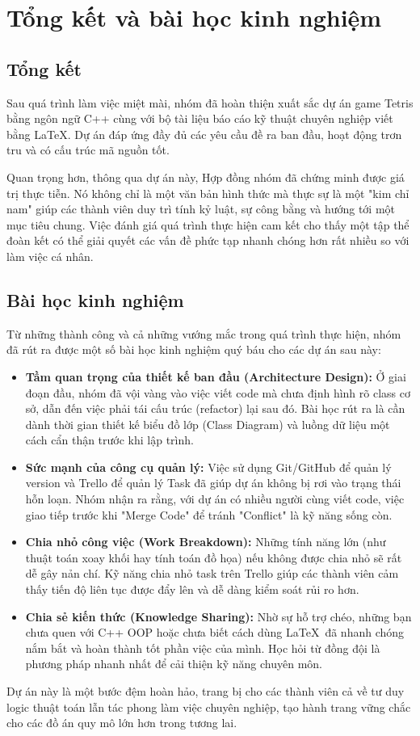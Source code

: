 \section{Tổng kết và bài học kinh nghiệm}

\subsection{Tổng kết}
Sau quá trình làm việc miệt mài, nhóm đã hoàn thiện xuất sắc dự án game Tetris bằng ngôn ngữ C++ cùng với bộ tài liệu báo cáo kỹ thuật chuyên nghiệp viết bằng \LaTeX. Dự án đáp ứng đầy đủ các yêu cầu đề ra ban đầu, hoạt động trơn tru và có cấu trúc mã nguồn tốt. 

Quan trọng hơn, thông qua dự án này, Hợp đồng nhóm đã chứng minh được giá trị thực tiễn. Nó không chỉ là một văn bản hình thức mà thực sự là một "kim chỉ nam" giúp các thành viên duy trì tính kỷ luật, sự công bằng và hướng tới một mục tiêu chung. Việc đánh giá quá trình thực hiện cam kết cho thấy một tập thể đoàn kết có thể giải quyết các vấn đề phức tạp nhanh chóng hơn rất nhiều so với làm việc cá nhân.

\subsection{Bài học kinh nghiệm}
Từ những thành công và cả những vướng mắc trong quá trình thực hiện, nhóm đã rút ra được một số bài học kinh nghiệm quý báu cho các dự án sau này:

\begin{itemize}
    \item \textbf{Tầm quan trọng của thiết kế ban đầu (Architecture Design):} Ở giai đoạn đầu, nhóm đã vội vàng vào việc viết code mà chưa định hình rõ class cơ sở, dẫn đến việc phải tái cấu trúc (refactor) lại sau đó. Bài học rút ra là cần dành thời gian thiết kế biểu đồ lớp (Class Diagram) và luồng dữ liệu một cách cẩn thận trước khi lập trình.
    \item \textbf{Sức mạnh của công cụ quản lý:} Việc sử dụng Git/GitHub để quản lý version và Trello để quản lý Task đã giúp dự án không bị rơi vào trạng thái hỗn loạn. Nhóm nhận ra rằng, với dự án có nhiều người cùng viết code, việc giao tiếp trước khi "Merge Code" để tránh "Conflict" là kỹ năng sống còn.
    \item \textbf{Chia nhỏ công việc (Work Breakdown):} Những tính năng lớn (như thuật toán xoay khối hay tính toán đồ họa) nếu không được chia nhỏ sẽ rất dễ gây nản chí. Kỹ năng chia nhỏ task trên Trello giúp các thành viên cảm thấy tiến độ liên tục được đẩy lên và dễ dàng kiểm soát rủi ro hơn.
    \item \textbf{Chia sẻ kiến thức (Knowledge Sharing):} Nhờ sự hỗ trợ chéo, những bạn chưa quen với C++ OOP hoặc chưa biết cách dùng \LaTeX\ đã nhanh chóng nắm bắt và hoàn thành tốt phần việc của mình. Học hỏi từ đồng đội là phương pháp nhanh nhất để cải thiện kỹ năng chuyên môn.
\end{itemize}

Dự án này là một bước đệm hoàn hảo, trang bị cho các thành viên cả về tư duy logic thuật toán lẫn tác phong làm việc chuyên nghiệp, tạo hành trang vững chắc cho các đồ án quy mô lớn hơn trong tương lai.
